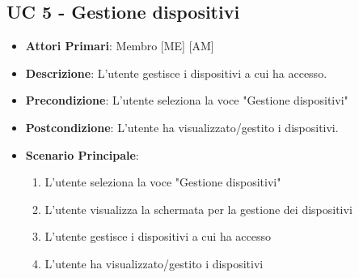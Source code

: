 	\subsection{UC 5 - Gestione dispositivi}
		
		
		\begin{itemize}
			\item \textbf{Attori Primari}: Membro [ME] [AM]
			\item \textbf{Descrizione}: L'utente gestisce i dispositivi a cui ha accesso.
			\item \textbf{Precondizione}: L'utente seleziona la voce "Gestione dispositivi"
			\item \textbf{Postcondizione}: L'utente ha visualizzato/gestito i dispositivi.
			\item \textbf{Scenario Principale}:
			\begin{enumerate}
				\item{L'utente seleziona la voce "Gestione dispositivi"}
				\item{L'utente visualizza la schermata per la gestione dei dispositivi}
				\item{L'utente gestisce i dispositivi a cui ha accesso}
				\item{L'utente ha visualizzato/gestito i dispositivi}
			\end{enumerate}
		\end{itemize}
			
